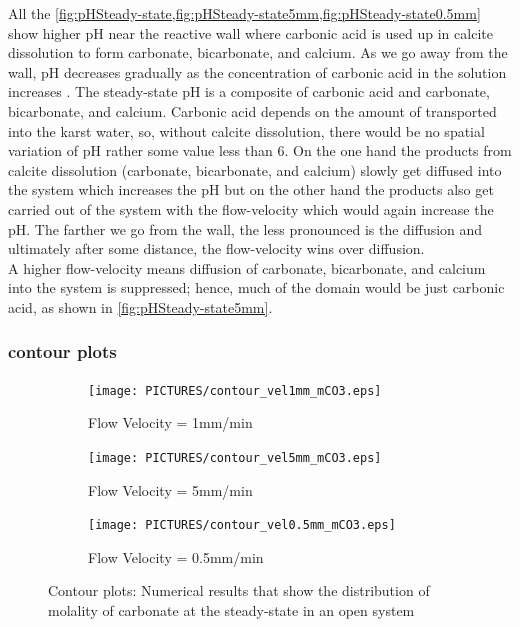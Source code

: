 All the \cref{fig:pHSteady-state,fig:pHSteady-state5mm,fig:pHSteady-state0.5mm} show higher pH near the reactive wall 
where carbonic acid is used up in calcite dissolution to form carbonate, bicarbonate, and calcium. 
As we go away from the wall, pH decreases gradually as the concentration of carbonic acid in the solution increases . 
The steady-state pH is a composite of carbonic acid and carbonate, bicarbonate, and calcium. Carbonic acid depends on the amount of  
transported into the karst water, so, without calcite dissolution, there would be no spatial variation of pH rather some value less than 6. 
On the one hand the products from calcite dissolution (carbonate, bicarbonate, and calcium) slowly get diffused into the system which 
increases the pH but on the other hand the products also get carried 
out of the system with the flow-velocity which would again increase the pH. The farther we go from the wall, the less pronounced is the diffusion 
and ultimately after some distance, the flow-velocity wins over diffusion. \\

A higher flow-velocity means diffusion of carbonate, bicarbonate, and calcium into the system is suppressed; hence, much of the domain would be 
just carbonic acid, as shown in \cref{fig:pHSteady-state5mm}. 

\subsubsection*{ contour plots} \label{sssec:contourmCO3}

\begin{figure}[!h]
\centering
    \begin{subfigure}{.5\linewidth}
        \centering
        \texttt{[image: PICTURES/contour\_vel1mm\_mCO3.eps]}
        \caption{Flow Velocity = 1mm/min}
        \label{fig:CO3Steady-state}       %
    \end{subfigure}%
    \hfill
    \begin{subfigure}{.5\linewidth}
        \centering
        \texttt{[image: PICTURES/contour\_vel5mm\_mCO3.eps]}
        \caption{Flow Velocity = 5mm/min}
        \label{fig:CO3Steady-state5mm}       %
    \end{subfigure}%
    \hfill
    \begin{subfigure}{.5\linewidth}
        \centering
        \texttt{[image: PICTURES/contour\_vel0.5mm\_mCO3.eps]}
        \caption{Flow Velocity = 0.5mm/min}
        \label{fig:CO3Steady-state0.5mm}       %
    \end{subfigure}%
    \caption{\DuMuX Contour plots: Numerical results that show the distribution of molality of carbonate at the steady-state in an open system}
     \label{fig:contourCO3}
\end{figure}

